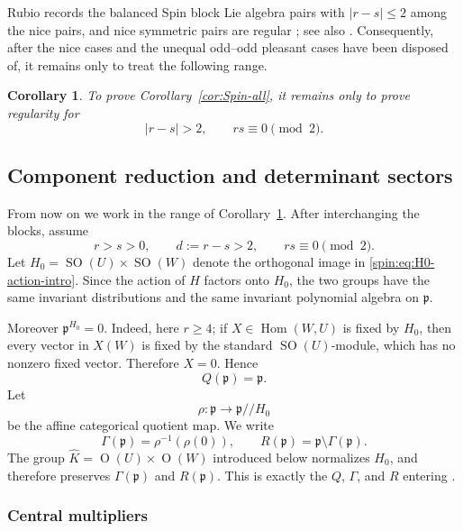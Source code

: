 \documentclass[10pt,a4paper]{amsart}
\numberwithin{equation}{section}
\newtheorem{corollary}[theorem]{Corollary}
\newcommand{\SO}{\operatorname{SO}}
\newcommand{\Or}{\operatorname{O}}
\newcommand{\Hom}{\operatorname{Hom}}
\newcommand{\fp}{\mathfrak p}
\begin{document}
Rubio records the balanced Spin block Lie algebra pairs with $|r-s|\le2$
among the nice pairs, and nice symmetric pairs are regular
\cite[Lemmas~4.21--4.22 and Table~3]{Rubio}; see also
\cite{Sekiguchi,Aiz13}.  Consequently, after the nice cases and the
unequal odd--odd pleasant cases have been disposed of, it remains only to
treat the following range.

\begin{corollary}\label{spin:cor:remaining}
To prove Corollary~\ref{cor:Spin-all}, it remains only to prove regularity for
\[
  |r-s|>2,
  \qquad
  rs\equiv0\pmod2.
\]
\end{corollary}

\subsection{Component reduction and determinant sectors}\label{spin:sec:component}

From now on we work in the range of Corollary~\ref{spin:cor:remaining}.  After
interchanging the blocks, assume
\begin{equation}\label{spin:eq:standing}
  r>s>0,
  \qquad
  d:=r-s>2,
  \qquad
  rs\equiv0\pmod2.
\end{equation}
Let $H_0=\SO(U)\times\SO(W)$ denote the orthogonal image in
\eqref{spin:eq:H0-action-intro}.  Since the action of $H$ factors onto $H_0$, the
two groups have the same invariant distributions and the same invariant
polynomial algebra on $\fp$.

Moreover $\fp^{H_0}=0$.  Indeed, here $r\ge4$; if
$X\in\Hom(W,U)$ is fixed by $H_0$, then every vector in $X(W)$ is fixed by
the standard $\SO(U)$-module, which has no nonzero fixed vector.  Therefore
$X=0$.  Hence
\[
  Q(\fp)=\fp.
\]
Let
\[
  \rho:\fp\longrightarrow \fp/\!/H_0
\]
be the affine categorical quotient map.  We write
\begin{equation}\label{spin:eq:Gamma-R}
  \Gamma(\fp)=\rho^{-1}(\rho(0)),
  \qquad
  R(\fp)=\fp\setminus\Gamma(\fp).
\end{equation}
The group $\widehat K=\Or(U)\times\Or(W)$ introduced below normalizes
$H_0$, and therefore preserves $\Gamma(\fp)$ and $R(\fp)$.  This is exactly
the $Q$, $\Gamma$, and $R$ entering
\cite[Notation~2.3.10 and Definition~7.4.2]{AG09}.

\subsubsection{Central multipliers}
\end{document}
